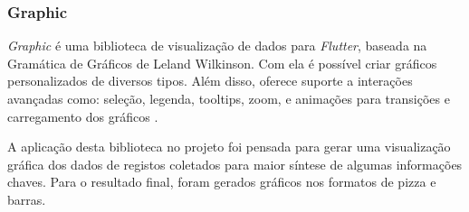 \subsubsection{Graphic}

\textit{Graphic} é uma biblioteca de visualização de dados para \textit{Flutter}, 
baseada 
na Gramática de Gráficos de Leland Wilkinson. Com ela é possível criar gráficos 
personalizados de diversos tipos. Além disso, oferece suporte 
a interações avançadas como: seleção, legenda, tooltips, zoom, e animações 
para transições e carregamento dos gráficos \cite{graphic_flutter}.

A aplicação desta biblioteca no projeto foi pensada para gerar uma 
visualização gráfica dos dados de registos coletados para maior síntese de
algumas informações chaves.
Para o resultado final, foram gerados gráficos nos formatos de pizza e barras.
